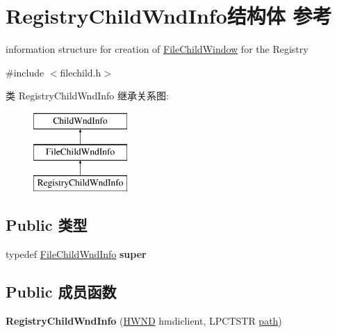 \hypertarget{struct_registry_child_wnd_info}{}\section{Registry\+Child\+Wnd\+Info结构体 参考}
\label{struct_registry_child_wnd_info}


information structure for creation of \hyperlink{struct_file_child_window}{File\+Child\+Window} for the Registry  




{\ttfamily \#include $<$filechild.\+h$>$}

类 Registry\+Child\+Wnd\+Info 继承关系图\+:\begin{figure}[H]
\begin{center}
\leavevmode
\includegraphics[height=3.000000cm]{struct_registry_child_wnd_info}
\end{center}
\end{figure}
\subsection*{Public 类型}
\begin{DoxyCompactItemize}
\item 
\mbox{\label{struct_registry_child_wnd_info_a181d817794a9b6905d37e5efee3b7b81}} 
typedef \hyperlink{struct_file_child_wnd_info}{File\+Child\+Wnd\+Info} {\bfseries super}
\end{DoxyCompactItemize}
\subsection*{Public 成员函数}
\begin{DoxyCompactItemize}
\item 
\mbox{\label{struct_registry_child_wnd_info_ac26b9e50bf75e313839e759442f899eb}} 
{\bfseries Registry\+Child\+Wnd\+Info} (\hyperlink{interfacevoid}{H\+W\+ND} hmdiclient, L\+P\+C\+T\+S\+TR \hyperlink{structpath}{path})
\end{DoxyCompactItemize}
